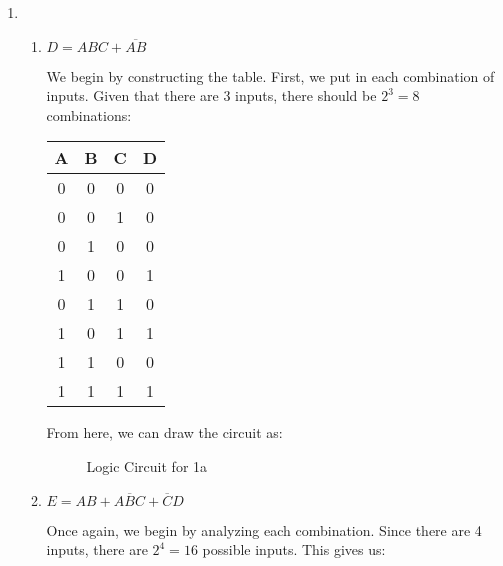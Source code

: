 \begin{enumerate}

  \item

    \begin{enumerate}

      \item $D=ABC+\overline{AB}$

        We begin by constructing the table. First, we put in each combination of inputs. Given that there are 3 inputs, there should be $2^3=8$ combinations:

        \begin{center}
          \begin{tabular}[H]{|c|c|c|c|}
            \hline
            A & B & C & D\\
            \hline
            0 & 0 & 0 & 0\\
            \hline
            0 & 0 & 1 & 0\\
            \hline
            0 & 1 & 0 & 0\\
            \hline
            1 & 0 & 0 & 1\\
            \hline
            0 & 1 & 1 & 0\\
            \hline
            1 & 0 & 1 & 1\\
            \hline
            1 & 1 & 0 & 0\\
            \hline
            1 & 1 & 1 & 1\\
            \hline
          \end{tabular}
        \end{center}

        From here, we can draw the circuit as:

        \begin{figure}[H]
          \centering
          
          \caption{Logic Circuit for 1a}
          \label{fig:1}
        \end{figure}

      \item $E=AB+A\overline{B}C+\overline{C}D$

        Once again, we begin by analyzing each combination. Since there are 4 inputs, there are $2^4=16$ possible inputs. This gives us:


\end{enumerate}
\end{enumerate}
